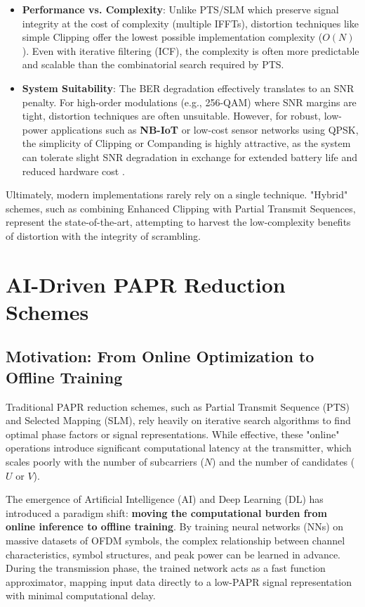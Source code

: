\documentclass[conference]{IEEEtran}
\begin{document}
\begin{itemize}
    \item \textbf{Performance vs. Complexity}: Unlike PTS/SLM which preserve signal integrity at the cost of complexity (multiple IFFTs), distortion techniques like simple Clipping offer the lowest possible implementation complexity ($O(N)$). Even with iterative filtering (ICF), the complexity is often more predictable and scalable than the combinatorial search required by PTS.
    \item \textbf{System Suitability}: The BER degradation effectively translates to an SNR penalty. For high-order modulations (e.g., 256-QAM) where SNR margins are tight, distortion techniques are often unsuitable. However, for robust, low-power applications such as \textbf{NB-IoT} or low-cost sensor networks using QPSK, the simplicity of Clipping or Companding is highly attractive, as the system can tolerate slight SNR degradation in exchange for extended battery life and reduced hardware cost \cite{ref12}.
\end{itemize}

Ultimately, modern implementations rarely rely on a single technique. "Hybrid" schemes, such as combining Enhanced Clipping with Partial Transmit Sequences, represent the state-of-the-art, attempting to harvest the low-complexity benefits of distortion with the integrity of scrambling.

\section{AI-Driven PAPR Reduction Schemes}

\subsection{Motivation: From Online Optimization to Offline Training}
Traditional PAPR reduction schemes, such as Partial Transmit Sequence (PTS) and Selected Mapping (SLM), rely heavily on iterative search algorithms to find optimal phase factors or signal representations. While effective, these "online" operations introduce significant computational latency at the transmitter, which scales poorly with the number of subcarriers ($N$) and the number of candidates ($U$ or $V$).

The emergence of Artificial Intelligence (AI) and Deep Learning (DL) has introduced a paradigm shift: \textbf{moving the computational burden from online inference to offline training}. By training neural networks (NNs) on massive datasets of OFDM symbols, the complex relationship between channel characteristics, symbol structures, and peak power can be learned in advance. During the transmission phase, the trained network acts as a fast function approximator, mapping input data directly to a low-PAPR signal representation with minimal computational delay.
\end{document}
